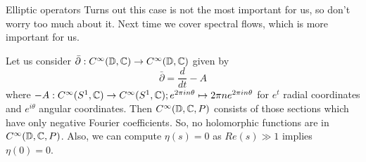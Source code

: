 \begin{clear}{Elliptic operators}
 Turns out this case is not the most important for us, so don't worry too much about it. Next time we cover spectral flows, which is more important for us.


\begin{example}
Let us consider $\bar{\partial}: C^\infty (\mathbb{D}, \mathbb{C}) \to C^\infty (\mathbb{D}, \mathbb{C})$ given by $$\bar{\partial} = \frac{d}{dt} - A$$ where $-A: C^\infty(S^1, \mathbb{C}) \to  C^\infty(S^1, \mathbb{C}); e^{2\pi i n\theta} \mapsto 2 \pi n e^{2\pi i n\theta}$  for $e^t$ radial coordinates and $e^{i\theta}$ angular coordinates.
Then  $C^\infty (\mathbb{D}, \mathbb{C}, P)$ consists of those sections which have only negative Fourier coefficients. So, no holomorphic functions are in $C^\infty (\mathbb{D}, \mathbb{C}, P)$. Also, we can compute $\eta(s) = 0$ as $Re(s) \gg 1$ implies $\eta(0) = 0$.

\end{example}

\end{clear}